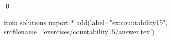 
\begin{ex} 
  \label{ex:countability15}
  
  \qed
\end{ex} 
\begin{python0}
from solutions import *
add(label="ex:countability15",
    srcfilename='exercises/countability15/answer.tex') 
\end{python0}

